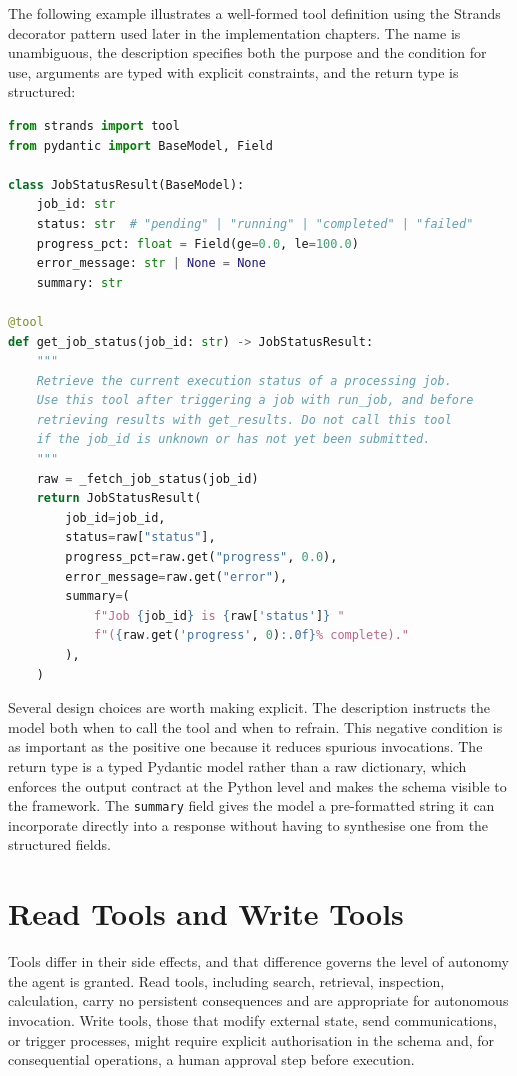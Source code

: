 The following example illustrates a well-formed tool definition using the Strands
decorator pattern used later in the implementation chapters. The name is unambiguous, the description
specifies both the purpose and the condition for use, arguments are typed with explicit
constraints, and the return type is structured:

\begin{lstlisting}[language=Python]
from strands import tool
from pydantic import BaseModel, Field

class JobStatusResult(BaseModel):
    job_id: str
    status: str  # "pending" | "running" | "completed" | "failed"
    progress_pct: float = Field(ge=0.0, le=100.0)
    error_message: str | None = None
    summary: str

@tool
def get_job_status(job_id: str) -> JobStatusResult:
    """
    Retrieve the current execution status of a processing job.
    Use this tool after triggering a job with run_job, and before
    retrieving results with get_results. Do not call this tool
    if the job_id is unknown or has not yet been submitted.
    """
    raw = _fetch_job_status(job_id)
    return JobStatusResult(
        job_id=job_id,
        status=raw["status"],
        progress_pct=raw.get("progress", 0.0),
        error_message=raw.get("error"),
        summary=(
            f"Job {job_id} is {raw['status']} "
            f"({raw.get('progress', 0):.0f}% complete)."
        ),
    )
\end{lstlisting}

Several design choices are worth making explicit. The description instructs the model
both when to call the tool and when to refrain. This negative condition is as important
as the positive one because it reduces spurious invocations. The return type is a typed
Pydantic model rather than a raw dictionary, which enforces the output contract at the
Python level and makes the schema visible to the framework. The \texttt{summary} field
gives the model a pre-formatted string it can incorporate directly into a response
without having to synthesise one from the structured fields.

\section{Read Tools and Write Tools}

Tools differ in their side effects, and that difference governs the level of autonomy
the agent is granted. Read tools, including search, retrieval, inspection, calculation, carry no
persistent consequences and are appropriate for autonomous invocation. Write tools, those
that modify external state, send communications, or trigger processes, might require
explicit authorisation in the schema and, for consequential operations, a human approval
step before execution.

